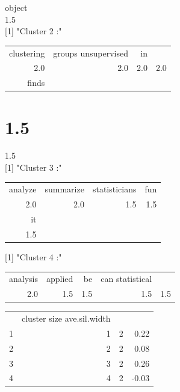 \documentclass[10pt]{book}
\begin{document}
object\\
1.5\\[0pt]
[1] "Cluster 2 :"

\begin{center}
\begin{tabular}{rrrr}
clustering & groups unsupervised & in &  \\
2.0 & 2.0 & 2.0 & 2.0 \\
finds &  &  &  \\
\end{tabular}
\end{center}

\section*{1.5}
1.5\\[0pt]
[1] "Cluster 3 :"

\begin{center}
\begin{tabular}{rrrr}
analyze & summarize & statisticians & fun \\
2.0 & 2.0 & 1.5 & 1.5 \\
it &  &  &  \\
1.5 &  &  &  \\
\end{tabular}
\end{center}

[1] "Cluster 4 :"

\begin{center}
\begin{tabular}{rrrrr}
analysis & applied & be & can statistical &  \\
2.0 & 1.5 & 1.5 & 1.5 & 1.5 \\
\end{tabular}
\end{center}

\begin{center}
\begin{tabular}{lrrr}
 & cluster size ave.sil.width &  &  \\
1 & 1 & 2 & 0.22 \\
2 & 2 & 2 & 0.08 \\
3 & 3 & 2 & 0.26 \\
4 & 4 & 2 & -0.03 \\
\end{tabular}
\end{center}
\end{document}

